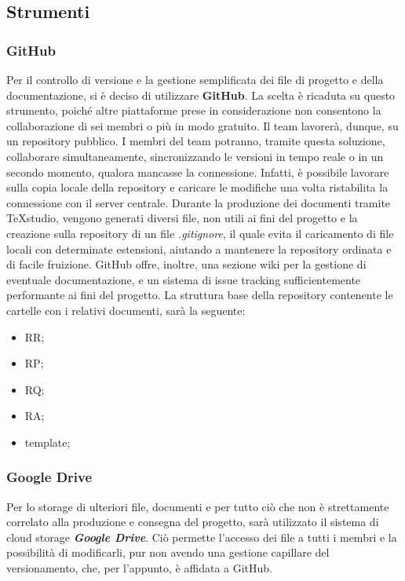 	\subsection{Strumenti}

		\subsubsection{GitHub}
		Per il controllo di versione e la gestione semplificata dei file di progetto e della documentazione, si è deciso di utilizzare \textbf{GitHub}. La scelta è ricaduta su questo strumento, poiché altre piattaforme prese in considerazione non consentono la collaborazione di sei membri o più in modo gratuito. Il team lavorerà, dunque, su un repository pubblico. I membri del team potranno, tramite questa soluzione, collaborare simultaneamente, sincronizzando le versioni in tempo reale o in un secondo momento, qualora mancasse la connessione. Infatti, è possibile lavorare sulla copia locale della repository e caricare le modifiche una volta ristabilita la connessione con il server centrale. Durante la produzione dei documenti tramite TeXstudio, vengono generati diversi file, non utili ai fini del progetto e la creazione sulla repository di un file \textit{.gitignore}, il quale evita il caricamento di file locali con determinate estensioni, aiutando a mantenere la repository ordinata e di facile fruizione. GitHub offre, inoltre, una sezione wiki per la gestione di eventuale documentazione, e un sistema di issue tracking sufficientemente performante ai fini del progetto. 
		La struttura base della repository contenente le cartelle con i relativi documenti, sarà la seguente:
		\begin{itemize}
			\item RR;
			\item RP;
			\item RQ;
			\item RA;
			\item template;
		\end{itemize}

		\subsubsection{Google Drive}
		Per lo storage di ulteriori file, documenti e per tutto ciò che non è strettamente correlato alla produzione e consegna del progetto, sarà utilizzato il sistema di cloud storage \textbf{\textit{Google Drive}}. Ciò permette l'accesso dei file a tutti i membri e la possibilità di modificarli, pur non avendo una gestione capillare del versionamento, che, per l'appunto, è affidata a GitHub.

